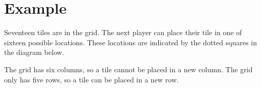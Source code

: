 \documentclass[a4paper, 10pt, notumble]{leaflet}
\makeatletter
\newcommand{\smallat}{{\setmainfont{Comic Neue-Bold} \Large @}}
\newcommand{\smallpound}{{\setmainfont{Comic Neue-Bold} \large \#}}
\newcommand{\smalldollar}{{\setmainfont{Comic Neue-Bold} \large \$}}
\newcommand{\smallpercent}{{\setmainfont{Comic Neue-Bold} \large \%}}
\newcommand{\smallampersand}{{\setmainfont{Comic Neue-Bold} \large \$}}
\newcommand{\smallasterisk}{{\setmainfont{Quicksand-Bold} \Huge \raisebox{-0.25ex}{\textasteriskcentered{}}}}
\makeatother
\begin{document}
\section{Example}
%
%
%
%
%
%
%
%
%
%
%
%
%
Seventeen tiles are in the grid. The next player can place their tile in one of sixteen possible locations. These locations are indicated by the dotted squares in the diagram below.

The grid has six columns, so a tile cannot be placed in a new column. The grid only has five rows, so a tile can be placed in a new row.
\end{document}
